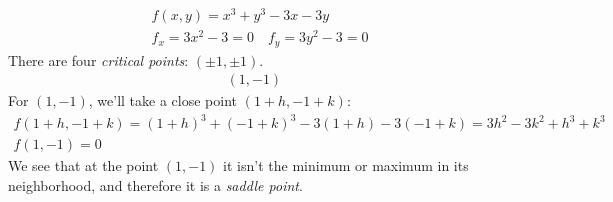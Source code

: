 \documentclass[00_complete]{subfiles}
\begin{document}
\begin{example}
    \begin{gather*}
        f(x,y)=x^3+y^3-3x-3y \\
        f_x=3x^2-3=0 \quad f_y = 3y^2-3=0
    \end{gather*}
    There are four \emph{critical points}: $(\pm1,\pm1)$.
    \begin{align*}
        (1,-1) &
    \end{align*}
    For $(1,-1)$, we'll take a close point $(1+h,-1+k)$:
    \begin{gather*}
        f(1+h,-1+k)=(1+h)^3+(-1+k)^3-3(1+h)-3(-1+k)=\boxed{3h^2-3k^2+h^3+k^3}\\
        f(1,-1)=0
    \end{gather*}
    We see that at the point $(1,-1)$ it isn't the minimum or maximum in its
    neighborhood, and therefore it is a \emph{saddle point}.
\end{example}
\end{document}
